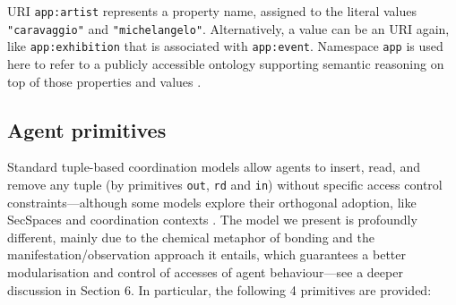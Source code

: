 \documentclass[12pt,a4paper,twoside,openright]{book}
\begin{document}
\noindent URI \texttt{app:artist} represents a property name, assigned to the literal values \mbox{\texttt{"caravaggio"}} and \mbox{\texttt{"michelangelo"}}. Alternatively, a value can be an URI again, like \texttt{app:exhibition} that is associated with \texttt{app:event}. Namespace \texttt{app} is used here to refer to a publicly accessible ontology supporting semantic reasoning on top of those properties and values \cite{SemMatchingSAC2013}.

\subsection{Agent primitives}
\label{s:agent}

Standard tuple-based coordination models allow agents to insert, read, and remove any tuple (by primitives \texttt{out}, \texttt{rd} and \texttt{in}) without specific access control constraints---although some models explore their orthogonal adoption, like SecSpaces \cite{GorrieriLZ06} and coordination contexts \cite{J-ORV-AAECC2005,RVO-ATAI2004}.
%
The model we present is profoundly different, mainly due to the chemical metaphor of bonding and the manifestation/observation approach it entails, which guarantees a better modularisation and control of accesses of agent behaviour---see a deeper discussion in Section 6.
%
In particular, the following 4 primitives are provided:
\end{document}
